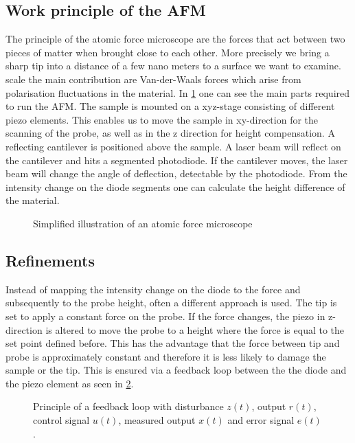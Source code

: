 \documentclass[paper=a4,fontsize=10pt,DIV=18,twocolumn,parskip=half]{scrartcl}
\numberwithin{equation}{section}    %
\begin{document}
\subsection{Work principle of the AFM}
The principle of the atomic force microscope are the forces that act between two 
pieces of matter when brought close to each other. More precisely we bring a 
sharp tip into a distance of a few nano meters to  a surface we want to examine.  
scale the main contribution are Van-der-Waals forces which arise from 
polarisation fluctuations in the material.
In \cref{afm_scheme} one can see the main parts required to run the AFM. 
The sample is mounted on a xyz-stage consisting of different piezo elements. 
This enables us to move the sample in xy-direction for the scanning of the 
probe, as well as in the z direction for height compensation. A reflecting 
cantilever is positioned above the sample. A laser beam will reflect on the 
cantilever and hits a segmented photodiode. If the cantilever moves, the 
laser beam will change the angle of deflection, detectable by the photodiode.
From the intensity change on the diode segments one can calculate the height 
difference of the material.

\begin{figure}
    \centering
    \caption{Simplified illustration of an atomic force microscope}
    \label{afm_scheme}
\end{figure}

\subsection{Refinements}
Instead of mapping the intensity change on the diode to the force and 
subsequently to the probe height, often a different approach is used. The tip is 
set to apply a constant force on the probe. If the force changes, the piezo in 
z-direction is altered to move the probe to a height where the force is equal to 
the set point defined before. This has the advantage that the force between tip 
and probe is approximately constant and therefore it is less likely to damage 
the sample or the tip. This is ensured via a feedback loop between the the diode 
and the piezo element as seen in \cref{control_loop}.

\begin{figure}
    \centering
    \caption{Principle of a feedback loop with disturbance $z(t)$, output 
        $r(t)$, control signal $u(t)$, measured output $x(t)$ and error signal 
        $e(t)$.}
    \label{control_loop}
\end{figure}
\end{document}
